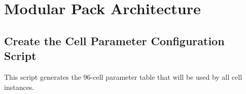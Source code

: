 \documentclass[11pt,a4paper]{article}
\begin{document}
\newpage
\section{Modular Pack Architecture}

\subsection{Create the Cell Parameter Configuration Script}

This script generates the 96-cell parameter table that will be used by all cell instances.
\end{document}
